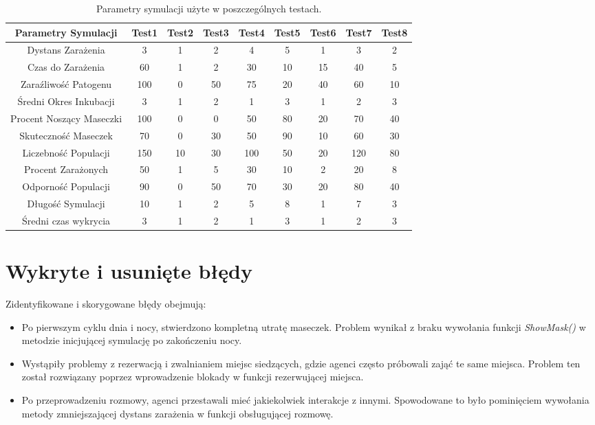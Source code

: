 \begin{table}[h!]
	\caption{Parametry symulacji użyte w poszczególnych testach.}
	\centering
	\begin{tabular}{|c|c|c|c|c|c|c|c|c|}
		\hline
		\textbf{Parametry Symulacji} & \textbf{Test1} & \textbf{Test2}  & \textbf{Test3}  & \textbf{Test4}  & \textbf{Test5} & \textbf{Test6} & \textbf{Test7} & \textbf{Test8}  \\
		\hline
		Dystans Zarażenia & 3 & 1 & 2 & 4 & 5 & 1 & 3 & 2\\
		\hline
		Czas do Zarażenia & 60 &  1 & 2 & 30 & 10 & 15 & 40 & 5\\
		\hline
		Zaraźliwość Patogenu & 100  & 0 & 50 & 75 & 20 & 40 & 60 & 10\\
		\hline
		Średni Okres Inkubacji & 3 & 1 & 2 & 1 & 3 & 1 & 2 & 3\\
		\hline
		Procent Noszący Maseczki & 100 & 0 & 0 & 50 & 80 & 20 & 70 & 40\\
		\hline
		Skuteczność Maseczek & 70 & 0 & 30 & 50 & 90 & 10 & 60 & 30\\
		\hline
		Liczebność Populacji & 150 & 10& 30 & 100 & 50 & 20 & 120 & 80\\
		\hline
		Procent Zarażonych & 50 & 1 & 5 & 30 & 10 & 2 & 20 & 8\\
		\hline
		Odporność Populacji & 90 & 0 & 50 & 70 & 30 & 20 & 80 & 40\\
		\hline
		Długość Symulacji & 10 & 1 & 2 & 5 & 8 & 1 & 7 & 3\\
		\hline
		Średni czas wykrycia & 3 & 1 & 2 & 1 & 3 & 1 & 2 & 3\\
		\hline
	\end{tabular}
	\label{tab:parameters}
\end{table}







\section{Wykryte i usunięte błędy}

Zidentyfikowane i skorygowane błędy obejmują:
\begin{itemize}
	\item Po pierwszym cyklu dnia i nocy, stwierdzono kompletną utratę maseczek. Problem wynikał z braku wywołania funkcji \textit{ShowMask()} w metodzie inicjującej symulację po zakończeniu nocy.
	\item Wystąpiły problemy z rezerwacją i zwalnianiem miejsc siedzących, gdzie agenci często próbowali zająć te same miejsca. Problem ten został rozwiązany poprzez wprowadzenie blokady w funkcji rezerwującej miejsca.
	\item Po przeprowadzeniu rozmowy, agenci przestawali mieć jakiekolwiek interakcje z innymi. Spowodowane to było pominięciem wywołania metody zmniejszającej dystans zarażenia w funkcji obsługującej rozmowę.
\end{itemize}

%


